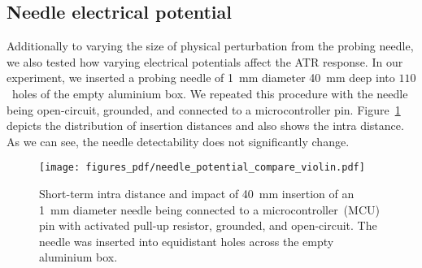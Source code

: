 \documentclass[conference]{IEEEtran}
\begin{document}
\subsection{Needle electrical potential}
Additionally to varying the size of physical perturbation from the probing needle, we also tested how varying electrical potentials affect the ATR response. In our experiment, we inserted a probing needle of \SI{1}{\mm} diameter \SI{40}{\mm} deep into $110$~holes of the empty aluminium box. We repeated this procedure with the needle being open-circuit, grounded, and connected to a microcontroller pin. Figure~\ref{fig:needle_potential} depicts the distribution of insertion distances and also shows the intra distance. As we can see, the needle detectability does not significantly change.


\begin{figure}[h!]
\centering
\texttt{[image: figures\_pdf/needle\_potential\_compare\_violin.pdf]}
\caption{Short-term intra distance and impact of \SI{40}{\mm} insertion of an \SI{1}{\mm} diameter needle being connected to a microcontroller~(MCU) pin with activated pull-up resistor, grounded, and open-circuit. The needle was inserted into equidistant holes across the empty aluminium box.}
\label{fig:needle_potential}
\end{figure} 
\end{document}
